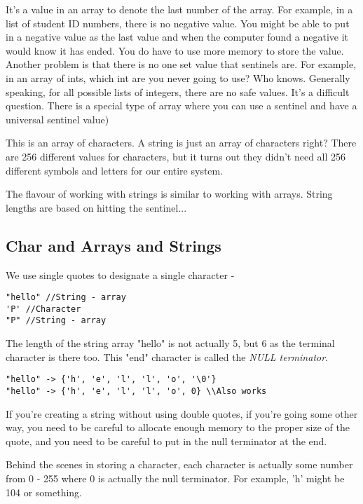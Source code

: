 \documentclass[12pt]{article}
\theoremstyle{definition}
\begin{document}
It's a value in an array to denote the last number of the array. For example, in a list of student ID numbers, there is no negative value. You might be able to put in a negative value as the last value and when the computer found a negative it would know it has ended. You do have to use more memory to store the value. Another problem is that there is no one set value that sentinels are. For example, in an array of ints, which int are you never going to use? Who knows. Generally speaking, for all possible lists of integers, there are no safe values. It's a difficult question. There is a special type of array where you can use a sentinel and have a universal sentinel value)

This is an array of characters. A string is just an array of characters right? There are 256 different values for characters, but it turns out they didn't need all 256 different symbols and letters for our entire system. 

The flavour of working with strings is similar to working with arrays. String lengths are based on hitting the sentinel... 

\subsection{Char and Arrays and Strings}
We use single quotes to designate a single character - 
\begin{lstlisting}
"hello" //String - array
'P' //Character
"P" //String - array
\end{lstlisting}

The length of the string array "hello" is not actually 5, but 6 as the terminal character is there too. This "end" character is called the \emph{NULL terminator}. 

\begin{lstlisting}
"hello" -> {'h', 'e', 'l', 'l', 'o', '\0'}
"hello" -> {'h', 'e', 'l', 'l', 'o', 0} \\Also works
\end{lstlisting}

If you're creating a string without using double quotes, if you're going some other way, you need to be careful to allocate enough memory to the proper size of the quote, and you need to be careful to put in the null terminator at the end. 

Behind the scenes in storing a character, each character is actually some number from 0 - 255 where 0 is actually the null terminator. For example, 'h' might be 104 or something. 
\end{document}
